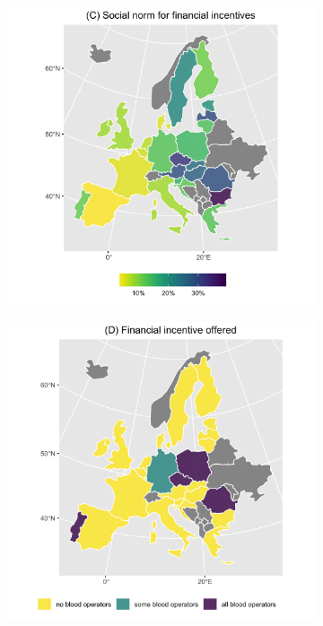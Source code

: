 \documentclass[AER]{AEA}
\begin{document}
\begin{figure}[t!]
\newline

\begin{subfigure}{.48\textwidth}
  \centering
  \includegraphics[width=\linewidth]{images/soc_financial.png}  
\end{subfigure}
\begin{subfigure}{.48\textwidth}
  \centering
  \includegraphics[width=\linewidth]{images/incentive_financial_NA_removed.png}  

\end{subfigure}
\end{figure}
\end{document}
